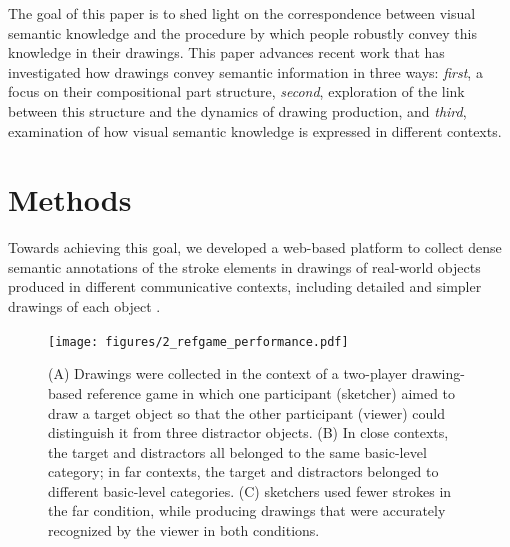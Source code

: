 \documentclass[10pt,letterpaper]{article}
\begin{document}

The goal of this paper is to shed light on the correspondence between visual semantic knowledge and the procedure by which people robustly convey this knowledge in their drawings.
This paper advances recent work \cite{FanCommon2018} that has investigated how drawings convey semantic information in three ways: 
\textit{first}, a focus on their compositional part structure,
\textit{second}, exploration of the link between this structure and the dynamics of drawing production,
and \textit{third}, examination of how visual semantic knowledge is expressed in different contexts. 


\section{Methods}

Towards achieving this goal, we developed a web-based platform to collect dense semantic annotations of the stroke elements in drawings of real-world objects produced in different communicative contexts, including detailed and simpler drawings of each object  \cite{deLeeuw2015} .  

\begin{figure}[htbp]
\centering
\texttt{[image: figures/2\_refgame\_performance.pdf]}
\caption{(A) Drawings were collected in the context of a two-player drawing-based reference game in which one participant (sketcher) aimed to draw a target object so that the other participant (viewer) could distinguish it from three distractor objects. (B) In close contexts, the target and distractors all belonged to the same basic-level category; in far contexts, the target and distractors belonged to different basic-level categories. (C) sketchers used fewer strokes in the far condition, while producing drawings that were accurately recognized by the viewer in both conditions.}
\label{refgame_performance}
\end{figure}
\end{document}
